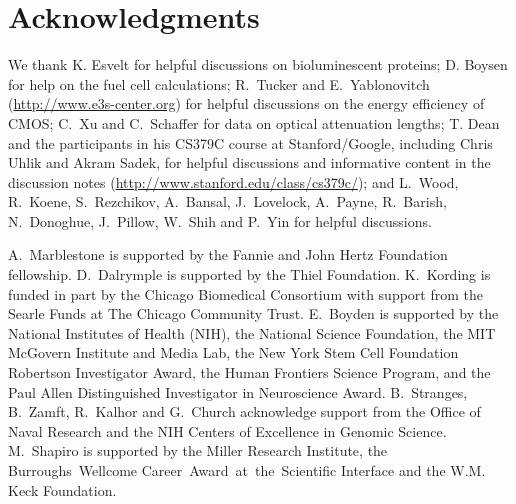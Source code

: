 \section{Acknowledgments}

We thank K. Esvelt for helpful discussions on bioluminescent proteins; D. Boysen for help on the fuel cell calculations; R.~Tucker and E.~Yablonovitch (\url{http://www.e3s-center.org}) for helpful discussions on the energy efficiency of CMOS; C.~Xu and C.~Schaffer for data on optical attenuation lengths; T. Dean and the participants in his CS379C course at Stanford/Google, including Chris Uhlik and Akram Sadek, for helpful discussions and informative content in the discussion notes (\url{http://www.stanford.edu/class/cs379c/}); and L.~Wood, R.~Koene, S.~Rezchikov, A.~Bansal, J.~Lovelock, A.~Payne, R.~Barish, N.~Donoghue, J.~Pillow, W.~Shih and P.~Yin for helpful discussions.

A.~Marblestone is supported by the Fannie and John Hertz Foundation fellowship.
D.~Dalrymple is supported by the Thiel Foundation.
K.~Kording is funded in part by the Chicago Biomedical Consortium with support from the Searle Funds at The Chicago Community Trust.
E.~Boyden is supported by the National Institutes of Health (NIH), the National Science Foundation, the MIT
McGovern Institute and Media Lab, the New York Stem Cell Foundation Robertson Investigator
Award, the Human Frontiers Science Program, and the Paul Allen Distinguished Investigator in
Neuroscience Award.
B.~Stranges, B.~Zamft, R.~Kalhor and G.~Church acknowledge support from the Office of Naval Research and the NIH Centers of Excellence in Genomic Science.
M.~Shapiro is supported by the Miller Research Institute, the Burroughs~Wellcome Career~Award~at~the~Scientific Interface and the W.M. Keck Foundation.

\printbibliography[notsubtype=hide]



